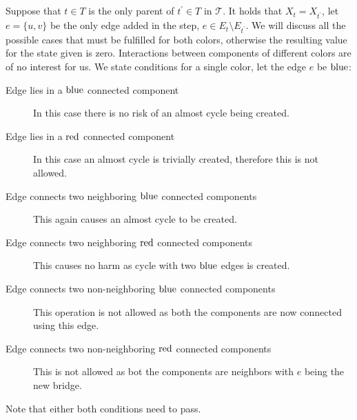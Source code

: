 \subsection{\IntroduceEdgeNode}

Suppose that \( t \in T \) is
the only parent of \( t^\prime \in T \) in \( \mathcal {T} \).
It holds that \( X_t = X_{t^\prime} \),
let \( e = \{u, v\} \) be the only edge added in the step, \( e \in E_t \setminus E_{t^\prime} \).
We will discuss all the possible cases that must be fulfilled for both colors,
otherwise the resulting value for the state given is zero.
Interactions between components of different colors are of no interest for us.
We state conditions for a single color, \WLOG{} let the edge \( e \) be \( \text{blue} \):
%
\begin{description}
	\item[Edge lies in a \( \text{blue} \) connected component]
	      In this case there is no risk of an almost cycle being created.
	\item[Edge lies in a \( \text{red} \) connected component]
	      In this case an almost cycle is trivially created,
	      therefore this is not allowed.
	\item[Edge connects two neighboring \( \text{blue} \) connected components]
	      This again causes an almost cycle to be created.
	\item[Edge connects two neighboring \( \text{red} \) connected components]
	      This causes no harm as cycle with two \( \text{blue} \) edges is created.
	\item[Edge connects two non-neighboring \( \text{blue} \) connected components]
	      This operation is not allowed as both the components
	      are now connected using this edge.
	\item[Edge connects two non-neighboring \( \text{red} \) connected components]
	      This is not allowed as bot the components
	      are neighbors with \( e \) being the new bridge.
\end{description}
%
Note that either both conditions need to pass.

